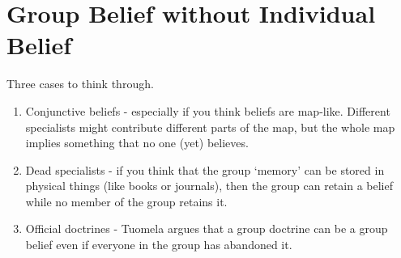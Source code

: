 \section{Group Belief without Individual Belief}
\label{groupbeliefwithoutindividualbelief}

Three cases to think through.

\begin{enumerate}
\item{} Conjunctive beliefs - especially if you think beliefs are map-like. Different specialists might contribute different parts of the map, but the whole map implies something that no one (yet) believes.

\item{} Dead specialists - if you think that the group `memory' can be stored in physical things (like books or journals), then the group can retain a belief while no member of the group retains it.

\item{} Official doctrines - Tuomela argues that a group doctrine can be a group belief even if everyone in the group has abandoned it.

\end{enumerate}


